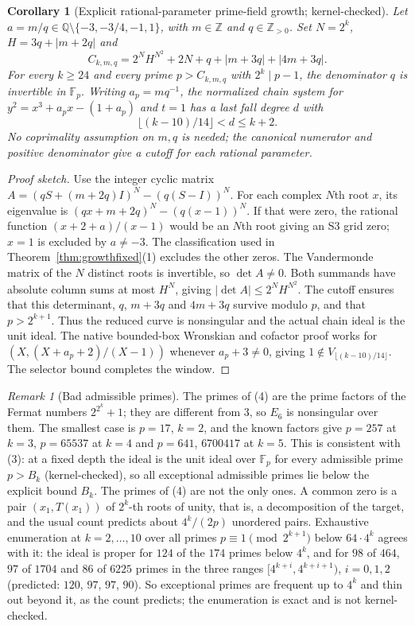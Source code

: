 \documentclass[11pt]{article}
\newtheorem{corollary}[theorem]{Corollary}
\theoremstyle{definition}\newtheorem{definition}[theorem]{Definition}
\theoremstyle{remark}\newtheorem{remark}[theorem]{Remark}
\newcommand{\F}{\mathbb F}
\begin{document}
\begin{corollary}[Explicit rational-parameter prime-field growth; kernel-checked]
\label{cor:rationalprime}
Let $a=m/q\in\mathbb{Q}\setminus\{-3,-3/4,-1,1\}$, with $m\in\mathbb{Z}$
and $q\in\mathbb{Z}_{>0}$. Set $N=2^k$, $H=3q+|m+2q|$ and
\[
 C_{k,m,q}=2^N H^{N^2}+2N+q+|m+3q|+|4m+3q|.
\]
For every $k\ge24$ and every prime $p>C_{k,m,q}$ with $2^k\mid p-1$,
the denominator $q$ is invertible in $\F_p$. Writing $a_p=mq^{-1}$, the
normalized chain system for $y^2=x^3+a_px-(1+a_p)$ and $t=1$ has a last
fall degree $d$ with
\[
 \lfloor(k-10)/14\rfloor<d\le k+2.
\]
No coprimality assumption on $m,q$ is needed; the canonical numerator and
positive denominator give a cutoff for each rational parameter.
\end{corollary}
\begin{proof}[Proof sketch]
Use the integer cyclic matrix
$A=(qS+(m+2q)I)^N-(q(S-I))^N$.
For each complex $N$th root $x$, its eigenvalue is
$(qx+m+2q)^N-(q(x-1))^N$. If that were zero, the rational function
$(x+2+a)/(x-1)$ would be an $N$th root giving an S3 grid zero;
$x=1$ is excluded by $a\ne-3$. The classification used in Theorem~\ref{thm:growthfixed}(1)
excludes the other zeros. The Vandermonde matrix of the $N$ distinct
roots is invertible, so $\det A\ne0$. Both summands have absolute column
sums at most $H^N$, giving $|\det A|\le2^N H^{N^2}$.
The cutoff ensures that this determinant, $q$, $m+3q$ and $4m+3q$
survive modulo $p$, and that $p>2^{k+1}$. Thus the reduced curve is
nonsingular and the actual chain ideal is the unit ideal. The native
bounded-box Wronskian and cofactor proof works for $(X,(X+a_p+2)/(X-1))$
whenever $a_p+3\ne0$, giving $1\notin V_{\lfloor(k-10)/14\rfloor}$.
The selector bound completes the window.
\end{proof}

\begin{remark}[Bad admissible primes]\label{rem:fermatbad}
The primes of (4) are the prime factors of the Fermat numbers
$2^{2^k}+1$; they are different from $3$, so $E_6$ is nonsingular over
them. The smallest case is $p=17$, $k=2$, and the known factors give
$p=257$ at $k=3$, $p=65537$ at $k=4$ and $p=641$, $6700417$ at $k=5$.
This is consistent with (3): at a fixed depth the ideal is the unit ideal
over $\F_p$ for every admissible prime $p>B_k$ (kernel-checked), so all
exceptional admissible primes lie below the explicit bound $B_k$. The primes of (4) are not the only ones. A common zero is a pair
$(x_1,T(x_1))$ of $2^k$-th roots of unity, that is, a decomposition of the
target, and the usual count predicts about $4^k/(2p)$ unordered pairs.
Exhaustive enumeration at $k=2,\ldots,10$ over all primes
$p\equiv1\pmod{2^{k+1}}$ below $64\cdot4^k$ agrees with it: the ideal is
proper for $124$ of the $174$ primes below $4^k$, and for $98$ of $464$,
$97$ of $1704$ and $86$ of $6225$ primes in the three ranges
$[4^{k+i},4^{k+i+1})$, $i=0,1,2$ (predicted: $120$, $97$, $97$, $90$).
So exceptional primes are frequent up to $4^k$ and thin out beyond it, as
the count predicts; the enumeration is exact and is not kernel-checked.
\end{remark}
\end{document}
